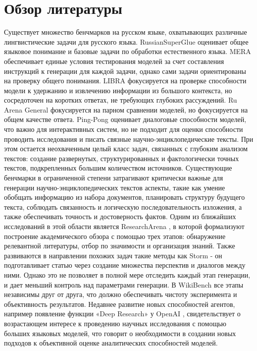 \documentclass{article}
\theoremstyle{definition}
\theoremstyle{plain}
\begin{document}
\section*{Обзор литературы}
Существует множество бенчмарков на русском языке, охватывающих различные лингвистические задачи для русского языка.
RussianSuperGlue \cite{rsglue} оценивает общее языковое понимание и базовые задачи по обработки естественного языка. 
MERA \cite{mera} обеспечивает единые условия тестирования моделей за счет составления инструкций к генерации для каждой задачи, однако сами задачи ориентированы на проверку общего понимания. 
LIBRA \cite{libra} фокусируется на проверке способности модели к удержанию и извлечению информации из большого контекста, но сосредоточен на коротких ответах, не требующих глубоких рассуждений. 
Ru Arena General \cite{arena} фокусируется на парном сравнении моделей, но фокусируется на общем качестве ответа.
Ping-Pong \cite{pp} оценивает диалоговые способности моделей, что важно для интерактивных систем, но не подходит для оценки способности проводить исследования и писать связные научно-энциклопедические тексты.
При этом остается неохваченным целый класс задач, связанных с глубоким анализом текстов: создание развернутых, структурированных и фактологически точных текстов, подкрепленных большим количеством источников. 
Существующие бенчмарки в ограниченной степени затрагивают критически важные для генерации научно-энциклопедических текстов аспекты, 
такие как умение обобщать информацию из набора документов, планировать структуру будущего текста, соблюдать связанность и логическую последовательность изложения, а также обеспечивать точность и достоверность фактов. 
Одним из ближайших исследований в этой области является ResearchArena \cite{resar}, в которой формализуют построение академического обзора с помощью трех этапов:
обнаружение релевантной литературы, отбор по значимости и организация знаний.
Также развиваются в направлении похожих задач такие методы как Storm \cite{storm} - он подготавливает статью через создание множества перспектив и диалогов между ними.
Однако это не позволяет в полной мере отследить каждый этап генерации, и дает меньший контроль над параметрами генерации. В WikiBench все этапы независимы друг от друга, 
что должно обеспечивать чистоту эксперимента и объективность результатов.
Недавнее развитие новых способностей агентов, например появление функции «Deep Research» у OpenAI \cite{deepr}, 
свидетельствует о возрастающем интересе к проведению научных исследования с помощью больших языковых моделей, 
что говорит о необходимости в создании новых подходов к объективной оценке аналитических способностей моделей. 
\end{document}
